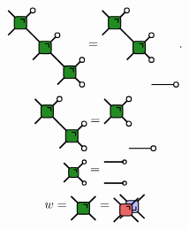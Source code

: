 \documentclass[a4paper,twocolumn,11pt,accepted=2024-02-08]{quantumarticle}
\theoremstyle{break}
\newcommand{\1}{\mathbbm{1}}
\theoremstyle{plain}
\theoremstyle{plain}
\theoremstyle{plain}
\newcommand{\Wgatered}[2]{
\draw[very thick] (#1-0.5, #2 +0.5) -- (#1+0.5,#2-0.5);
\draw[very thick] (#1-0.5,#2-0.5) -- (#1+0.5,#2+0.5);
\draw[ thick, fill=myred, rounded corners=2pt] (#1-0.25,#2+0.25) rectangle (#1+0.25,#2-0.25);
\draw[thick] (#1,#2+0.15) -- (#1+0.15,#2+0.15) -- (#1+0.15,#2);
}
\newcommand{\WgateblueT}[2]{
\draw[very thick] (#1-0.5, #2 +0.5) -- (#1+0.5,#2-0.5);
\draw[very thick] (#1-0.5,#2-0.5) -- (#1+0.5,#2+0.5);
\draw[ thick, fill=myblue, rounded corners=2pt] (#1-0.25,#2+0.25) rectangle (#1+0.25,#2-0.25);
\draw[thick] (#1,#2-0.15) -- (#1+0.15,#2-0.15) -- (#1+0.15,#2);
}
\newcommand{\Wgategreen}[2]{
\draw[very thick] (#1-0.5, #2 +0.5) -- (#1+0.5,#2-0.5);
\draw[very thick] (#1-0.5,#2-0.5) -- (#1+0.5,#2+0.5);
\draw[ thick, fill=mygreen, rounded corners=2pt] (#1-0.25,#2+0.25) rectangle (#1+0.25,#2-0.25);
\draw[thick] (#1,#2+0.15) -- (#1+0.15,#2+0.15) -- (#1+0.15,#2);
}
\newcommand{\MYcircle}[2]{
\draw[thick, fill=white] (#1,#2) circle (0.1cm); }
\begin{document}
\begin{equation*}
    \begin{tikzpicture}[baseline=(current  bounding  box.center), scale=0.7]
    \Wgategreen{-1.5}{0.5}
    \Wgategreen{-0.5}{-0.5}
    \Wgategreen{-2.5}{1.5}
    \MYcircle{-1}{1}
    \MYcircle{0}{0}
    \MYcircle{0}{-1}
    \MYcircle{-2}{2}
    \end{tikzpicture}
    =
    \begin{tikzpicture}[baseline=(current  bounding  box.center), scale=0.7]
    \Wgategreen{-1.5}{0.5}
    \Wgategreen{-2.5}{1.5}
    \draw[thick] (-1,-1)--(0,-1);
    \MYcircle{0}{-1}
    \MYcircle{-1}{0}
    \MYcircle{-1}{1}
    \MYcircle{-2}{2}
    \end{tikzpicture}
    .\label{eq:3rdHierarchydefinition}
\end{equation*}
\begin{equation*}
    \begin{tikzpicture}[baseline=(current  bounding  box.center), scale=0.7]
        \Wgategreen{-0.5}{0.5}
        \Wgategreen{0.5}{-0.5}
        \MYcircle{0}{1}
        \MYcircle{1}{0}
        \MYcircle{1}{-1}
        \end{tikzpicture}
        =
        \begin{tikzpicture}[baseline=(current  bounding  box.center), scale=0.7]
        \draw[thick] (0,-1)--(1,-1);
        \Wgategreen{-0.5}{0.5}
        \MYcircle{0}{1}
        \MYcircle{0}{00}
        \MYcircle{1}{-1}
    \end{tikzpicture}
\end{equation*}
\begin{equation*}
    \begin{tikzpicture}[baseline=(current  bounding  box.center), scale=0.55]
        \Wgategreen{0}{0}
        \MYcircle{0.55}{0.55}
        \MYcircle{0.55}{-0.55}
        \end{tikzpicture}
        =
        \begin{tikzpicture}[baseline=(current  bounding  box.center), scale=0.55]
        \MYcircle{0.55}{0.55}
        \MYcircle{0.55}{-0.55}
        \draw[very thick] (-0.5,0.55) -- (0.5,0.55);
        \draw[very thick] (-0.5,-0.55) -- (0.5,-0.55);
    \end{tikzpicture}
\end{equation*}
\begin{equation*}
    w=\begin{tikzpicture}[baseline=(current  bounding  box.center), scale=0.7]
    \Wgategreen{0}{0}
    \end{tikzpicture}
    =
    \begin{tikzpicture}[baseline=(current  bounding  box.center), scale=0.7]
    \WgateblueT{0.15}{0.07}
    \Wgatered{-0.1}{-0.07}
    \end{tikzpicture}
\end{equation*}
\end{document}
